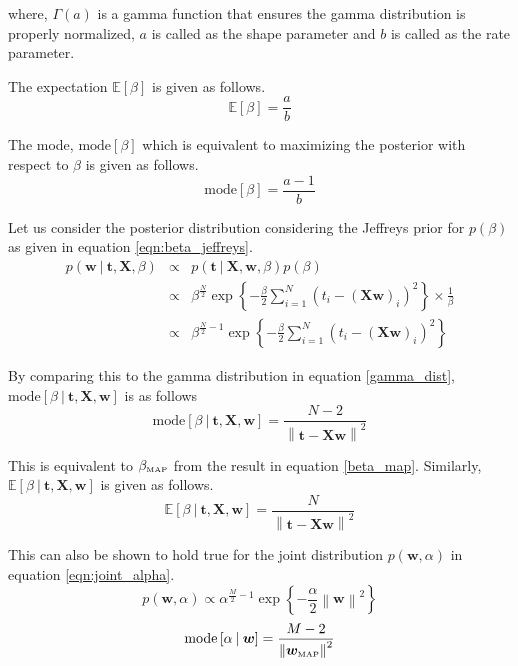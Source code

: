 \documentclass[11pt]{article}
\newcommand{\mean}[1]{\mathbb{E}\left[#1\right]}
\newcommand{\map}[1]{{#1}_{\text{\tiny MAP}}}
\newcommand\given[1][]{\:#1\vert\:}
\newcommand{\norm}[1]{\left\lVert#1\right\rVert}
\begin{document}
where, $\Gamma(a)$ is a gamma function that ensures the gamma distribution is properly normalized, $a$ is called as the shape parameter and $b$ is called as the rate parameter.  

The expectation $\mean{\beta}$ is given as follows.
\begin{equation}
    \mean{\beta} = \frac{a}{b}
\end{equation}

The mode, $\text{mode}\left[\beta\right]$ which is equivalent to maximizing the posterior with respect to $\beta$ is given as follows.
\begin{equation} \label{mode}
    \text{mode}\left[\beta\right] = \frac{a-1}{b}
\end{equation}

Let us consider the posterior distribution considering the Jeffreys prior for $p(\beta)$ as given in equation \ref{eqn:beta_jeffreys}.
\begin{eqnarray}
    p(\bm{w} \given \bm{t}, \bm{X}, \beta) 
    &\propto& p(\bm{t} \given \bm{X}, \bm{w}, \beta) p(\beta) \\
    &\propto& \beta^{\frac{N}{2}}\exp\left\{-\frac{\beta}{2} \sum_{i=1}^N(t_i - (\bm{X}\bm{w})_i)^2 \right\} \times \frac{1}{\beta} \\
    &\propto& \beta^{\frac{N}{2}-1}\exp\left\{-\frac{\beta}{2} \sum_{i=1}^N(t_i - (\bm{X}\bm{w})_i)^2 \right\}
\end{eqnarray}

By comparing this to the gamma distribution in equation \ref{gamma_dist}, $\text{mode}\left[\beta \given \bm{t}, \bm{X}, \bm{w}\right]$ is as follows
\begin{equation}
    \text{mode}\left[\beta \given \bm{t}, \bm{X}, \bm{w}\right] = \frac{N-2}{\norm{\bm{t} - \bm{X}\bm{w}}^2}
\end{equation}

This is equivalent to $\map{\beta}$ from the result in equation \ref{beta_map}. Similarly, $\mean{\beta \given \bm{t}, \bm{X}, \bm{w}}$ is given as follows.
\begin{equation}
    \mean{\beta \given \bm{t}, \bm{X}, \bm{w}} = \frac{N}{\norm{\bm{t} - \bm{X}\bm{w}}^2}
\end{equation}

This can also be shown to hold true for the joint distribution $p(\bm{w}, \alpha)$ in equation \ref{eqn:joint_alpha}.
\begin{equation}
    p(\bm{w},\alpha) \propto \alpha^{\frac{M}{2}-1}\exp{\left\{ -\frac{\alpha}{2}\norm{\bm{w}}^2\right\}}
\end{equation}
\begin{equation}
    \text{mode}\left[\alpha \given \bm{w}\right] = \frac{M-2}{\norm{\map{\bm{w}}}^2}
\end{equation}
\end{document}
